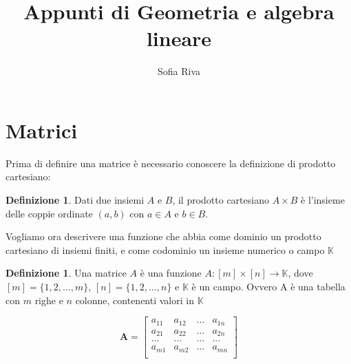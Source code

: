 \documentclass[a4paper, 12pt]{article}
\title{Appunti di Geometria e algebra lineare}
\author{Sofia Riva}
\theoremstyle{definition}
\newtheorem{defn}[thm]{Definizione}
\begin{document}
\maketitle

\newpage
\section{Matrici}
\noindent Prima di definire una matrice è necessario conoscere la definizione di prodotto cartesiano:
\begin{defn}
Dati due insiemi \( A \) e \( B \), il prodotto cartesiano \( A \times B \) è l'insieme delle coppie ordinate \( (a,b) \) con \( a \in A \) e \( b \in B \).
\end{defn}
\noindent Vogliamo ora descrivere una funzione che abbia come dominio un prodotto cartesiano di insiemi finiti, e come codominio un insieme numerico o campo $\mathds{K}$
\begin{defn}
Una matrice \( A \) è una funzione \( A: [m] \times [n] \to \mathds{K} \), dove \( [m] = \{1, 2, \dots, m\} \), \( [n] = \{1, 2, \dots, n\} \) e \( \mathds{K} \) è un campo. Ovvero A è una tabella con $m$ righe e $n$ colonne, contenenti valori in $\mathds{K}$
\end{defn}
\[ 
\boldsymbol{A} = \begin{bmatrix}
a_{11} & a_{12} & ... & a_{1n} \\
a_{21} & a_{22} & ... & a_{2n} \\
... & ... & ... & ... \\
a_{m1} & a_{m2} & ... & a_{mn} \\
\end{bmatrix}
\]
\end{document}
